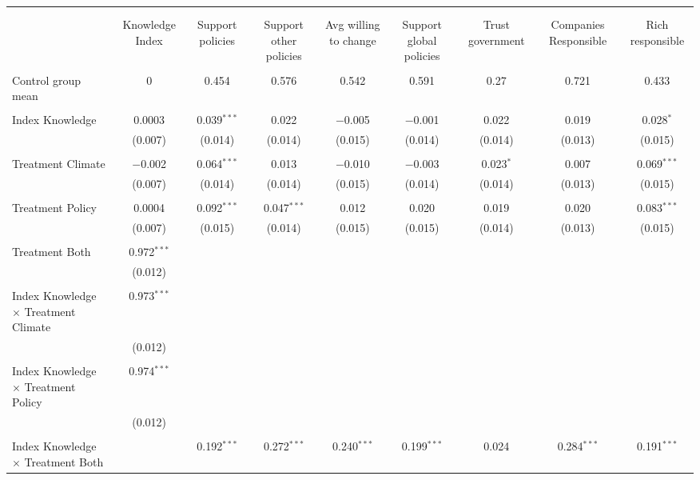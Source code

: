 
\begin{tabular}{@{\extracolsep{5pt}}lcccccccc} 
\\[-1.8ex]\hline 
\hline \\[-1.8ex] 
\\[-1.8ex] & Knowledge Index & Support policies & Support other policies & Avg willing to change & Support global policies & Trust government & Companies Responsible & Rich responsible \\ 
\hline \\[-1.8ex] 
 Control group mean & 0 & 0.454 & 0.576 & 0.542 & 0.591 & 0.27 & 0.721 & 0.433  \\ \hline \\[-1.8ex] Index Knowledge & 0.0003 & 0.039$^{***}$ & 0.022 & $-$0.005 & $-$0.001 & 0.022 & 0.019 & 0.028$^{*}$ \\ 
  & (0.007) & (0.014) & (0.014) & (0.015) & (0.014) & (0.014) & (0.013) & (0.015) \\ 
  & & & & & & & & \\ 
 Treatment Climate & $-$0.002 & 0.064$^{***}$ & 0.013 & $-$0.010 & $-$0.003 & 0.023$^{*}$ & 0.007 & 0.069$^{***}$ \\ 
  & (0.007) & (0.014) & (0.014) & (0.015) & (0.014) & (0.014) & (0.013) & (0.015) \\ 
  & & & & & & & & \\ 
 Treatment Policy & 0.0004 & 0.092$^{***}$ & 0.047$^{***}$ & 0.012 & 0.020 & 0.019 & 0.020 & 0.083$^{***}$ \\ 
  & (0.007) & (0.015) & (0.014) & (0.015) & (0.015) & (0.014) & (0.013) & (0.015) \\ 
  & & & & & & & & \\ 
 Treatment Both & 0.972$^{***}$ &  &  &  &  &  &  &  \\ 
  & (0.012) &  &  &  &  &  &  &  \\ 
  & & & & & & & & \\ 
 Index Knowledge $\times$ Treatment Climate & 0.973$^{***}$ &  &  &  &  &  &  &  \\ 
  & (0.012) &  &  &  &  &  &  &  \\ 
  & & & & & & & & \\ 
 Index Knowledge $\times$ Treatment Policy & 0.974$^{***}$ &  &  &  &  &  &  &  \\ 
  & (0.012) &  &  &  &  &  &  &  \\ 
  & & & & & & & & \\ 
 Index Knowledge $\times$ Treatment Both &  & 0.192$^{***}$ & 0.272$^{***}$ & 0.240$^{***}$ & 0.199$^{***}$ & 0.024 & 0.284$^{***}$ & 0.191$^{***}$ \\ 

\end{tabular}

